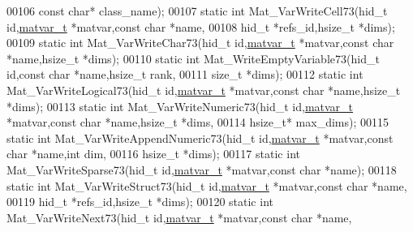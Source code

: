 \begin{DoxyCode}
00106                    \textcolor{keyword}{const} \textcolor{keywordtype}{char}* class\_name);
00107 \textcolor{keyword}{static} \textcolor{keywordtype}{int}     Mat\_VarWriteCell73(hid\_t \textcolor{keywordtype}{id},\hyperlink{group___m_a_t_structmatvar__t}{matvar\_t} *matvar,\textcolor{keyword}{const} \textcolor{keywordtype}{char} *name,
00108                    hid\_t *refs\_id,hsize\_t *dims);
00109 \textcolor{keyword}{static} \textcolor{keywordtype}{int}     Mat\_VarWriteChar73(hid\_t \textcolor{keywordtype}{id},\hyperlink{group___m_a_t_structmatvar__t}{matvar\_t} *matvar,\textcolor{keyword}{const} \textcolor{keywordtype}{char} *name,hsize\_t *dims);
00110 \textcolor{keyword}{static} \textcolor{keywordtype}{int}     Mat\_WriteEmptyVariable73(hid\_t \textcolor{keywordtype}{id},\textcolor{keyword}{const} \textcolor{keywordtype}{char} *name,hsize\_t rank,
00111                    \textcolor{keywordtype}{size\_t} *dims);
00112 \textcolor{keyword}{static} \textcolor{keywordtype}{int}     Mat\_VarWriteLogical73(hid\_t \textcolor{keywordtype}{id},\hyperlink{group___m_a_t_structmatvar__t}{matvar\_t} *matvar,\textcolor{keyword}{const} \textcolor{keywordtype}{char} *name,hsize\_t *dims);
00113 \textcolor{keyword}{static} \textcolor{keywordtype}{int}     Mat\_VarWriteNumeric73(hid\_t \textcolor{keywordtype}{id},\hyperlink{group___m_a_t_structmatvar__t}{matvar\_t} *matvar,\textcolor{keyword}{const} \textcolor{keywordtype}{char} *name,hsize\_t *dims,
00114                    hsize\_t* max\_dims);
00115 \textcolor{keyword}{static} \textcolor{keywordtype}{int}     Mat\_VarWriteAppendNumeric73(hid\_t \textcolor{keywordtype}{id},\hyperlink{group___m_a_t_structmatvar__t}{matvar\_t} *matvar,\textcolor{keyword}{const} \textcolor{keywordtype}{char} *name,\textcolor{keywordtype}{int} dim,
00116                    hsize\_t *dims);
00117 \textcolor{keyword}{static} \textcolor{keywordtype}{int}     Mat\_VarWriteSparse73(hid\_t \textcolor{keywordtype}{id},\hyperlink{group___m_a_t_structmatvar__t}{matvar\_t} *matvar,\textcolor{keyword}{const} \textcolor{keywordtype}{char} *name);
00118 \textcolor{keyword}{static} \textcolor{keywordtype}{int}     Mat\_VarWriteStruct73(hid\_t \textcolor{keywordtype}{id},\hyperlink{group___m_a_t_structmatvar__t}{matvar\_t} *matvar,\textcolor{keyword}{const} \textcolor{keywordtype}{char} *name,
00119                    hid\_t *refs\_id,hsize\_t *dims);
00120 \textcolor{keyword}{static} \textcolor{keywordtype}{int}     Mat\_VarWriteNext73(hid\_t \textcolor{keywordtype}{id},\hyperlink{group___m_a_t_structmatvar__t}{matvar\_t} *matvar,\textcolor{keyword}{const} \textcolor{keywordtype}{char} *name,

\end{DoxyCode}
